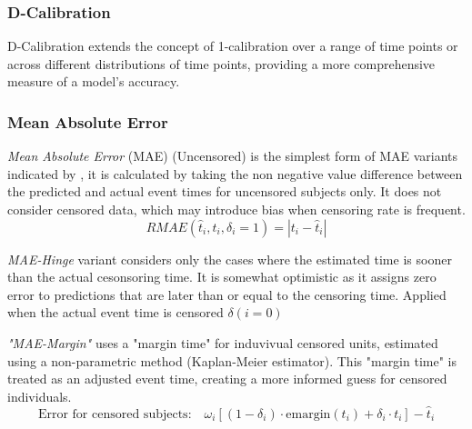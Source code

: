 \subsubsection*{D-Calibration}
\noindent D-Calibration \parencite{haider_effective_2018} extends the concept of 1-calibration over a range of time points or across different distributions of time points, providing a more comprehensive measure of a model's accuracy.


\subsubsection*{Mean Absolute Error}
\par \noindent \textit{Mean Absolute Error} (MAE) (Uncensored) is the simplest form of MAE variants indicated by \parencite{qi_effective_2023}, it is calculated by taking the non negative value difference between the predicted and actual event times for uncensored subjects only. It does not consider censored data, which may introduce bias when censoring rate is frequent.
\begin{equation} \label{eq:rmae}
RMAE (\hat{t}_i, t_i, \delta_i = 1) = |t_i - \hat{t}_i|
\end{equation}
\par \noindent \textit{MAE-Hinge} variant \parencite{qi_effective_2023} considers only the cases where the estimated time is sooner than the actual cesonsoring time. It is somewhat optimistic as it assigns zero error to predictions that are later than or equal to the censoring time. Applied when the actual event time is censored \(\delta (i =0)\)
\par \noindent \textit{"MAE-Margin"} \parencite{qi_effective_2023} uses a "margin time" for induvivual censored units, estimated using a non-parametric method (Kaplan-Meier estimator). This "margin time" is treated as an adjusted event time, creating a more informed guess for censored individuals.
\begin{equation} \label{eq:maemargin}
\text{Error for censored subjects:} \quad \omega_i[(1 - \delta_i) \cdot \text{emargin}(t_i) + \delta_i \cdot t_i] - \hat{t}_i
\end{equation}
